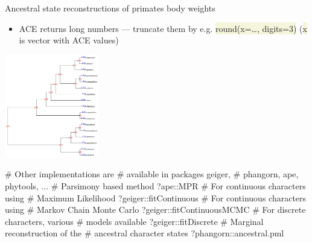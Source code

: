 \documentclass[compress, xelatex, 11pt, xcolor=svgnames, aspectratio=169,
	hyperref={
		bookmarks=true,
		unicode=true,
		colorlinks=true,
		pdftitle={Molecular data in R},
		plainpages=false,
		pdfauthor={Vojtech Zeisek},
		pdfsubject={Course about phylogeny and evolution in R},
		pdfcreator={XeLaTeX},
		pdfkeywords={R, evolution, phylogeny, molecular data},
		linkcolor=Crimson, %
		anchorcolor=Magenta, %
		citecolor=Magenta, %
		filecolor=Magenta, %
		menucolor=Magenta, %
		urlcolor=DodgerBlue, %
		},
	url={hyphens, lowtilde} %
	]{beamer}
\renewcommand{\texttt}[1]{\colorbox{Beige}{{\ttfamily #1}}}
\begin{document}
\begin{frame}[fragile]{Ancestral state reconstructions of primates body weights}
	\begin{multicols}{2}
		\begin{itemize}
			\item ACE returns long numbers --- truncate them by e.g. \texttt{round(x=\ldots, digits=3)} (\texttt{x} is vector with ACE values)
		\end{itemize}
		\begin{center}
			\includegraphics[height=4.5cm]{ace.png}
		\end{center}
		\begin{spluscode}
    # Other implementations are
    # available in packages geiger,
    # phangorn, ape, phytools, ...
    # Parsimony based method
    ?ape::MPR
    # For continuous characters using
    # Maximum Likelihood
    ?geiger::fitContinuous
    # For continuous characters using
    # Markov Chain Monte Carlo
    ?geiger::fitContinuousMCMC
    # For discrete characters, various
    # models available
    ?geiger::fitDiscrete
    # Marginal reconstruction of the
    # ancestral character states
    ?phangorn::ancestral.pml
		\end{spluscode}
	\end{multicols}
\end{frame}
\end{document}
